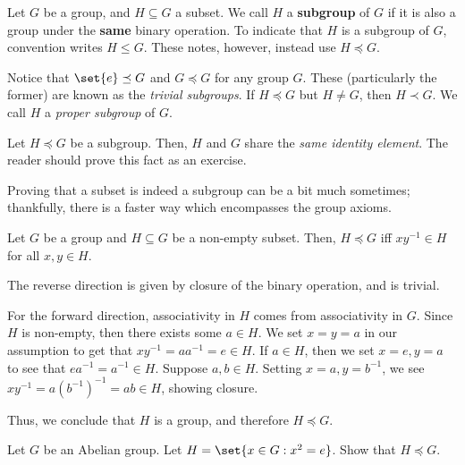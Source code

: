 \documentclass{article}
\begin{document}
\begin{defn}
Let $ G $ be a group, and $ H \subseteq G $ a subset. We call $ H $ a \textbf{subgroup} of $ G $ if it is also a group under the \textbf{same} binary operation. \vsp
To indicate that $ H $ is a subgroup of $ G $, convention writes $ H \leq G $. These notes, however, instead use $ H \preceq G $. \npgh

Notice that $ \set{e} \preceq G $ and $ G \preceq G $ for any group $ G $. These (particularly the former) are known as the \textit{trivial subgroups}. \vsp
If $ H \preceq G $ but $ H \neq G $, then $ H \prec G $. We call $ H $ a \textit{proper subgroup} of $ G $.
\end{defn}

\begin{lm}
Let $ H \preceq G $ be a subgroup. Then, $ H $ and $ G $ share the \textit{same identity element}. The reader should prove this fact as an exercise.
\end{lm}

Proving that a subset is indeed a subgroup can be a bit much sometimes; thankfully, there is a faster way which encompasses the group axioms.

\begin{thm}
Let $ G $ be a group and $ H \subseteq G $ be a non-empty subset. \vsp
Then, $ H \preceq G $ iff $ xy^{-1} \in H $ for all $ x, y \in H $.
\end{thm}

\begin{pf}[source=Primary Source Material]
The reverse direction is given by closure of the binary operation, and is trivial. \npgh

For the forward direction, associativity in $ H $ comes from associativity in $ G $. \vsp
Since $ H $ is non-empty, then there exists some $ a \in H $. We set $ x = y = a $ in our assumption to get that $ xy^{-1} = aa^{-1} = e \in H $. \vsp
If $ a \in H $, then we set $ x = e, y = a $ to see that $ ea^{-1} = a^{-1} \in H $. \vsp
Suppose $ a, b \in H $. Setting $ x = a, y = b^{-1} $, we see $ xy^{-1} = a(b^{-1})^{-1} = ab \in H $, showing closure. \npgh

Thus, we conclude that $ H $ is a group, and therefore $ H \preceq G $.
\end{pf}

\begin{prb}[source=Primary Source Material]
Let $ G $ be an Abelian group. Let $ H = \set{x \in G : x^{2} = e} $. Show that $ H \preceq G $.
\end{prb}
\end{document}
